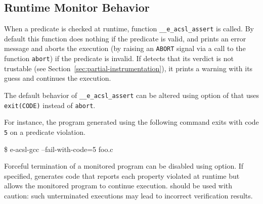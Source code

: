 


\subsection{Runtime Monitor Behavior}
\label{sec:monitor-behavior}

When a predicate is checked at runtime, function
\texttt{\_\_e\_acsl\_assert} is called.  By default
this function does nothing if the predicate is valid, and prints an error
message and aborts the execution (by raising an \texttt{ABORT} signal via a call
to the \C function \texttt{abort}) if the predicate is invalid. If \eacsl
detects that its verdict is not trustable (see
Section~\ref{sec:partial-instrumentation}), it prints a warning with its guess
and continues the execution.

The default behavior of \texttt{\_\_e\_acsl\_assert}
can be altered using  option of \eacslgcc
that uses \texttt{exit(CODE)} instead of \texttt{abort}.

For instance, the program generated using the following command
exits with code \texttt{5} on a predicate violation.
\begin{logs}
\$ e-acsl-gcc --fail-with-code=5 foo.c
\end{logs}

Forceful termination of a monitored program can be disabled using
 option. If specified, \eacslgcc generates code that
reports each property violated at runtime but allows the monitored program to
continue execution.  should be used with caution:
such unterminated executions may lead to incorrect verification results.


